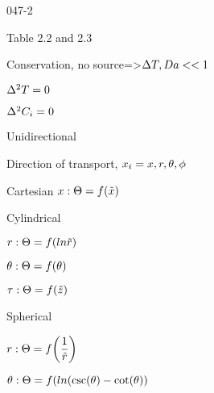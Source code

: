 \begin{mitframe}{047-2}
\begin{listone}
		\item Table 2.2 and 2.3
        \item Conservation, no source=>$\iipf\Temp, \damkohler<< 1$
        
        
        	\begin{listtwo}
            		\item$ \iipf^2\Temp=0$
                    \item $\iipf^2\conc_{\state}=0$
            \end{listtwo}
		\item Unidirectional
        	\begin{listtwo}
            		\item Direction of transport, $\specfrac{i}=\disp,\pos,\theta,\eleccoeff$
                    \item Cartesian $\disp: \dimltemp=\fug(\tilde{\disp})$
                    \item Cylindrical
                    		\begin{listthree}
                            		\item $\pos: \dimltemp=\fug(ln\tilde{\pos})$
                                    \item $\theta:\dimltemp=\fug(\theta)$
                                    \item $\torque:\dimltemp=\fug(\tilde{z})$
                                    \end{listthree}
            		\item Spherical
                    				\begin{listthree}
                                    		\item$\pos:\dimltemp=\fug\bigg(\dfrac{1}{\tilde{\pos}}\bigg)$
                                            \item $\theta:\dimltemp=\fug(ln(\csc(\theta)-\cot(\theta))$
                                            
                                    \end{listthree}
            \end{listtwo}
\end{listone}        
\end{mitframe}